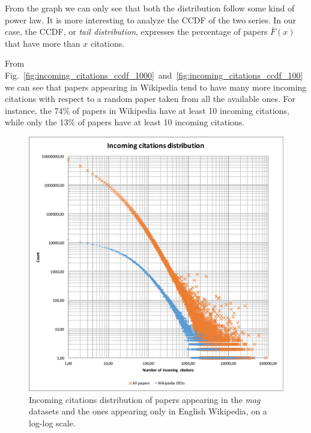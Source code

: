 From the graph we can only see that both the distribution follow some kind of power law.
It is more interesting to analyze the \ac{CCDF} of the two series.
In our case, the \ac{CCDF}, or \emph{tail distribution}, expresses the percentage of papers $\bar{F}(x)$ that have more than $x$ citations.

From Fig.~\ref{fig:incoming_citations_ccdf_1000}~and~\ref{fig:incoming_citations_ccdf_100} we can see that papers appearing in Wikipedia tend to have many more incoming citations with respect to a random paper taken from all the available ones.
For instance, the 74\% of papers in Wikipedia have at least 10 incoming citations, while only the 13\% of papers have at least 10 incoming citations.


\begin{figure}[h]
\centering
\includegraphics[keepaspectratio=true, width=\textwidth]{assets/incoming_cits_loglog}
\caption{Incoming citations distribution of papers appearing in the \emph{mag} datasets and the ones appearing only in English Wikipedia, on a log-log scale.}
\label{fig:incoming_citations_loglog}
\end{figure}

